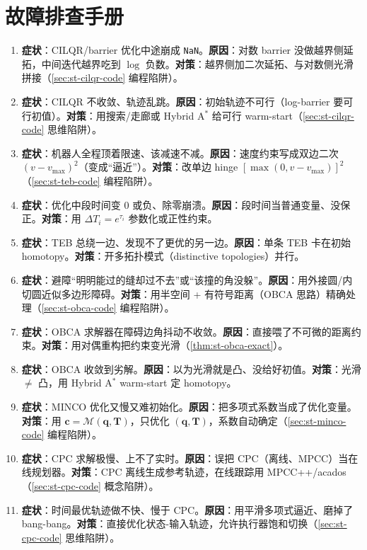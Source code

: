 \section*{故障排查手册}
\begin{enumerate}
  \item \textbf{症状}：CILQR/barrier 优化中途崩成 \texttt{NaN}。\textbf{原因}：对数 barrier 没做越界侧延拓，中间迭代越界吃到 $\log$ 负数。\textbf{对策}：越界侧加二次延拓、与对数侧光滑拼接（\cref{sec:st-cilqr-code} 编程陷阱）。
  \item \textbf{症状}：CILQR 不收敛、轨迹乱跳。\textbf{原因}：初始轨迹不可行（log-barrier 要可行初值）。\textbf{对策}：用搜索/走廊或 Hybrid A$^*$ 给可行 warm-start（\cref{sec:st-cilqr-code} 思维陷阱）。
  \item \textbf{症状}：机器人全程顶着限速、该减速不减。\textbf{原因}：速度约束写成双边二次 $(v-v_{\max})^2$（变成“逼近”）。\textbf{对策}：改单边 hinge $[\max(0,v-v_{\max})]^2$（\cref{sec:st-teb-code} 编程陷阱）。
  \item \textbf{症状}：优化中段时间变 $0$ 或负、除零崩溃。\textbf{原因}：段时间当普通变量、没保正。\textbf{对策}：用 $\Delta T_i=e^{\tau_i}$ 参数化或正性约束。
  \item \textbf{症状}：TEB 总绕一边、发现不了更优的另一边。\textbf{原因}：单条 TEB 卡在初始 homotopy。\textbf{对策}：开多拓扑模式（distinctive topologies）并行。
  \item \textbf{症状}：避障“明明能过的缝却过不去”或“该撞的角没躲”。\textbf{原因}：用外接圆/内切圆近似多边形障碍。\textbf{对策}：用半空间 + 有符号距离（OBCA 思路）精确处理（\cref{sec:st-obca-code} 编程陷阱）。
  \item \textbf{症状}：OBCA 求解器在障碍边角抖动不收敛。\textbf{原因}：直接喂了不可微的距离约束。\textbf{对策}：用对偶重构把约束变光滑（\cref{thm:st-obca-exact}）。
  \item \textbf{症状}：OBCA 收敛到劣解。\textbf{原因}：以为光滑就是凸、没给好初值。\textbf{对策}：光滑 $\ne$ 凸，用 Hybrid A$^*$ warm-start 定 homotopy。
  \item \textbf{症状}：MINCO 优化又慢又难初始化。\textbf{原因}：把多项式系数当成了优化变量。\textbf{对策}：用 $\mathbf c=\mathcal M(\mathbf q,\mathbf T)$，只优化 $(\mathbf q,\mathbf T)$，系数自动确定（\cref{sec:st-minco-code} 编程陷阱）。
  \item \textbf{症状}：CPC 求解极慢、上不了实时。\textbf{原因}：误把 CPC（离线、MPCC）当在线规划器。\textbf{对策}：CPC 离线生成参考轨迹，在线跟踪用 MPCC++/acados（\cref{sec:st-cpc-code} 概念陷阱）。
  \item \textbf{症状}：时间最优轨迹做不快、慢于 CPC。\textbf{原因}：用平滑多项式逼近、磨掉了 bang-bang。\textbf{对策}：直接优化状态-输入轨迹，允许执行器饱和切换（\cref{sec:st-cpc-code} 思维陷阱）。
\end{enumerate}

